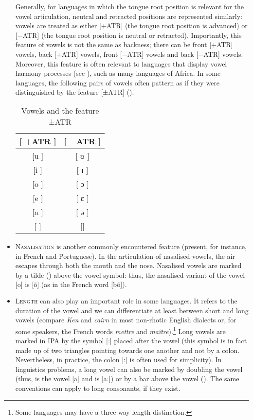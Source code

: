 \begin{refsection}
\begin{itemize}
Generally, for languages in which the tongue root position is relevant for the vowel articulation, neutral and retracted positions are represented similarly: vowels are treated as either [+ATR] (the tongue root position is advanced) or [−ATR] (the tongue root position is neutral or retracted). Importantly, this feature of vowels is not the same as backness; there can be front [+ATR] vowels, back [+ATR] vowels, front [−ATR] vowels and back [−ATR] vowels. Moreover, this feature is often relevant to languages that display vowel harmony processes (see ), such as many languages of Africa. In some languages, the following pairs of vowels often pattern as if they were distinguished by the feature [±ATR] ().

\begin{table}[H]
  \caption{Vowels and the feature ±ATR}
  \label{tab:vowelsFeatureATR}
    \begin{tabular}{ *2{ >{[} c <{]} } }
\lsptoprule
+ATR & −ATR \\ \midrule
{u} & {ʊ} \\
{i} & {ɪ} \\
{o} & {ɔ} \\
{e} & {ɛ} \\
{a‍} & {ə} \\
\lspbottomrule
\end{tabular}
\end{table}

\item \textsc{Nasalisation} is another commonly encountered feature (present, for instance, in French and Portuguese). In the articulation of nasalised vowels, the air escapes through both the mouth and the nose. Nasalised vowels are marked by a tilde (\cmubdata{\sim}) above the vowel symbol: thus, the nasalised variant of the vowel [{o}] is [{õ}] (as in the French word  [{bõ}]).

\item \textsc{Length} can also play an important role in some languages. It refers to the duration of the vowel and we can differentiate at least between short and long vowels (compare \textit{Ken} and \textit{cairn} in most non-rhotic English dialects or, for some speakers, the French words \textit{mettre} and \textit{maître}).\footnote{Some languages may have a three-way length distinction.} Long vowels are marked in IPA by the symbol [{ː}] placed after the vowel (this symbol is in fact made up of two triangles pointing towards one another and not by a colon. Nevertheless, in practice, the colon [{:}] is often used for simplicity). In linguistics problems, a long vowel can also be marked by doubling the vowel (thus,  is the vowel [{a}] and  is [{aː}]) or by a bar above the vowel (). The same conventions can apply to long consonants, if they exist.
\end{itemize}


\end{refsection}
